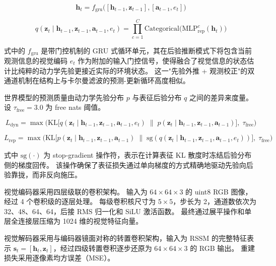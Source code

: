 \documentclass[12pt,a4paper]{ctexart}
\begin{document}
\begin{equation}
    \mathbf{h}_t = f_{\text{gru}}\big([\mathbf{h}_{t-1}, \mathbf{z}_{t-1}], [\mathbf{a}_{t-1}, e_t]\big)
    \label{eq:posterior_h}
\end{equation}

\begin{equation}
    q(\mathbf{z}_t \mid \mathbf{h}_{t-1}, \mathbf{z}_{t-1}, \mathbf{a}_{t-1}, e_t) = \prod_{c=1}^{C} \text{Categorical}\big(\text{MLP}_{\text{rep}}^c(\mathbf{h}_t)\big)
    \label{eq:posterior_z}
\end{equation}

式中的 $f_{\text{gru}}$ 是带门控机制的 GRU 式循环单元，其在后验推断模式下将包含当前观测信息的视觉编码 $e_t$ 作为附加的输入门控信号，使得融合了视觉信息的状态估计比纯粹的动力学先验更接近实际的环境状态。
这一"先验外推 + 观测校正"的双通道机制在结构上与卡尔曼滤波的预测-更新循环高度相似。

世界模型的预测质量由动力学先验分布 $p$ 与表征后验分布 $q$ 之间的差异来度量。
设 $\tau_{\text{free}} = 3.0$ 为 free nats 阈值。

\begin{equation}
    L_{\text{dyn}} = \max\Big( \text{KL}\big[q(\mathbf{z}_t \mid \mathbf{h}_{t-1}, \mathbf{z}_{t-1}, \mathbf{a}_{t-1}, e_t) \;\|\; p(\mathbf{z}_t \mid \mathbf{h}_{t-1}, \mathbf{z}_{t-1}, \mathbf{a}_{t-1})\big],\; \tau_{\text{free}} \Big)
    \label{eq:dyn_loss}
\end{equation}

\begin{equation}
    L_{\text{rep}} = \max\Big( \text{KL}\big[p(\mathbf{z}_t \mid \mathbf{h}_{t-1}, \mathbf{z}_{t-1}, \mathbf{a}_{t-1}) \;\|\; \text{sg}(q(\mathbf{z}_t \mid \mathbf{h}_{t-1}, \mathbf{z}_{t-1}, \mathbf{a}_{t-1}, e_t))\big],\; \tau_{\text{free}} \Big)
    \label{eq:rep_loss}
\end{equation}

式中 $\text{sg}(\cdot)$ 为 stop-gradient 操作符，表示在计算表征 KL 散度时冻结后验分布侧的梯度回传。
该操作确保了表征损失通过单向梯度的方式精确地驱动先验向后验靠拢，而非反向施压。

视觉编码器采用四层级联的卷积架构。
输入为 $64 \times 64 \times 3$ 的 uint8 RGB 图像，经过 4 个卷积级的逐层处理。
每级卷积核尺寸为 $5\times5$，步长为 2，通道数依次为 32、48、64、64，后接 RMS 归一化和 SiLU 激活函数。
最终通过展平操作和单层全连接层压缩为 1024 维的视觉特征向量。

视觉解码器采用与编码器镜面对称的转置卷积架构，输入为 RSSM 的完整特征表示 $\mathbf{s}_t = [\mathbf{h}_t, \mathbf{z}_t]$，经过四级转置卷积逐步还原为 $64 \times 64 \times 3$ 的 RGB 输出。
重建损失采用逐像素均方误差（MSE）。
\end{document}
